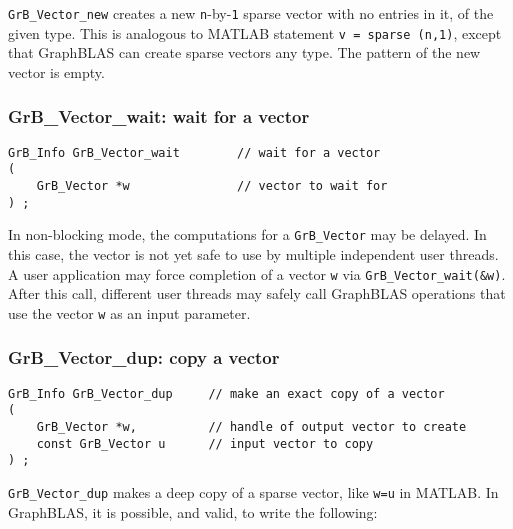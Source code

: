\documentclass[12pt]{article}
\begin{document}
\verb'GrB_Vector_new' creates a new \verb'n'-by-\verb'1' sparse vector with no
entries in it, of the given type.  This is analogous to MATLAB statement
\verb'v = sparse (n,1)', except that GraphBLAS can create sparse vectors any
type.  The pattern of the new vector is empty.

\subsubsection{{\sf GrB\_Vector\_wait:} wait for a vector}

\begin{mdframed}[userdefinedwidth=6in]
{\footnotesize
\begin{verbatim}
GrB_Info GrB_Vector_wait        // wait for a vector
(
    GrB_Vector *w               // vector to wait for
) ;
\end{verbatim}
}\end{mdframed}

In non-blocking mode, the computations for a \verb'GrB_Vector' may be delayed.
In this case, the vector is not yet safe to use by multiple independent user
threads.  A user application may force completion of a vector \verb'w' via
\verb'GrB_Vector_wait(&w)'.  After this call, different user threads may safely
call GraphBLAS operations that use the vector \verb'w' as an input parameter.

\subsubsection{{\sf GrB\_Vector\_dup:}           copy a vector}
\label{vector_dup}

\begin{mdframed}[userdefinedwidth=6in]
{\footnotesize
\begin{verbatim}
GrB_Info GrB_Vector_dup     // make an exact copy of a vector
(
    GrB_Vector *w,          // handle of output vector to create
    const GrB_Vector u      // input vector to copy
) ;
\end{verbatim}
} \end{mdframed}

\verb'GrB_Vector_dup' makes a deep copy of a sparse vector, like \verb'w=u' in
MATLAB.  In GraphBLAS, it is possible, and valid, to write the following:
\end{document}
